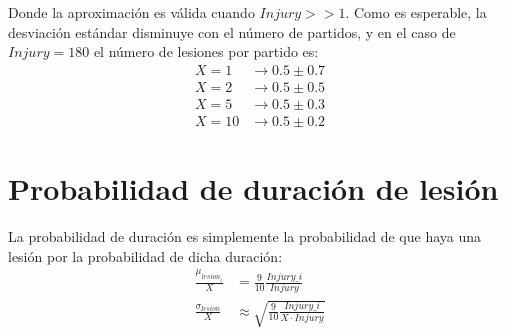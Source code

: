 \documentclass[a4paper,9pt]{article}
\begin{document}
Donde la aproximaci\'on es v\'alida cuando $Injury >> 1$. Como es esperable, la desviaci\'on est\'andar disminuye con el n\'umero de partidos, y en el caso de $Injury=180$ el n\'umero de lesiones por partido es:
\begin{align}
X=1&\rightarrow 0.5\pm0.7\\
X=2&\rightarrow 0.5\pm0.5\\
X=5&\rightarrow 0.5\pm0.3\\
X=10&\rightarrow 0.5\pm0.2
\end{align}

\section{Probabilidad de duraci\'on de lesi\'on}
La probabilidad de duraci\'on es simplemente la probabilidad de que haya una lesi\'on por la probabilidad de dicha duraci\'on:
\begin{align}
\frac{\mu_{lesion_i}}{X}&=\frac{9}{10}\frac{Injury\_i}{Injury}\\
\frac{\sigma_{lesion}}{X}&\approx\sqrt{\frac{9}{10}\frac{Injury\_i}{X\cdot Injury}}
\end{align}
\end{document}
